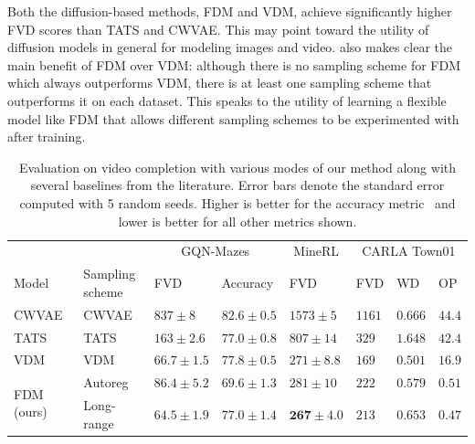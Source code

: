 Both the diffusion-based methods, FDM and VDM, achieve significantly higher FVD scores than TATS and CWVAE. This may point toward the utility of diffusion models in general for modeling images and video.  also makes clear the main benefit of FDM over VDM: although there is no sampling scheme for FDM which always outperforms VDM, there is at least one sampling scheme that outperforms it on each dataset. This speaks to the utility of learning a flexible model like FDM that allows different sampling schemes to be experimented with after training.

\begin{table}
  \small
  \caption{Evaluation on video completion with various modes of our method along with several baselines from the literature. Error bars denote the standard error computed with 5 random seeds. Higher is better for the accuracy metric~\cite{saxena2021clockwork} and lower is better for all other metrics shown.}
  \label{tab:results-completion}
  \centering
  \begin{tabular}{llllllll}
    \toprule
    \multicolumn{1}{r}{} & & \multicolumn{2}{c}{GQN-Mazes}  & \multicolumn{1}{c}{MineRL}  & \multicolumn{3}{c}{CARLA Town01} \\
    \cmidrule(r){3-4} \cmidrule(r){5-5} \cmidrule(r){6-8}
    Model &  Sampling scheme        & FVD      & Accuracy  & FVD     &  FVD     & WD  & OP \\
    \midrule
    \multirow{1}{*}{CWVAE~\citep{saxena2021clockwork}}
    & CWVAE  & $837 \pm 8$      & $82.6 \pm 0.5$  & $1573 \pm 5$                 & $1161$          & $0.666$   & $44.4$        \\
    \midrule
    \multirow{1}{*}{TATS~\citep{ge2022long}}
    & TATS   & $163 \pm 2.6$  &  $77.0 \pm 0.8$  & $807 \pm 14$          & $329$          & $1.648$          & $42.4$ \\
    \midrule
    \multirow{1}{*}{VDM~\citep{ho2022video}}
    & VDM   & $66.7 \pm 1.5$  &  $77.8 \pm 0.5$  & $271 \pm 8.8$          & $169$          & $0.501$          & $16.9$ \\
    \midrule
    \multirow{5}{*}{FDM (ours)}
    &  Autoreg        & $86.4 \pm 5.2$          & $69.6 \pm 1.3$   & $281 \pm 10$          & $222$          & $0.579$      & $0.51$     \\
    &  Long-range           & $64.5\pm1.9$            & $77.0 \pm 1.4$   & $\mathbf{267 \pm 4.0}$     & $213$          & $0.653$      & $\mathbf{0.47}$     \\

\end{tabular}
\end{table}
